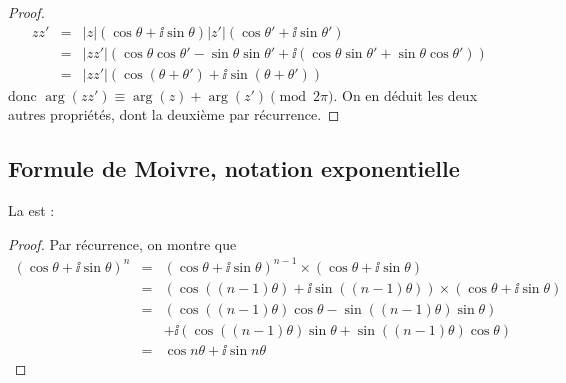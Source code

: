 \documentclass[class=report,crop=false]{standalone}
\begin{document}
\begin{proof}
  \begin{eqnarray*}
    zz' & = & \left| z \right|  \left( \cos \theta + \ii  \sin \theta \right)
    \left| z' \right|  \left( \cos \theta' + \ii  \sin \theta' \right)\\
    & = & \left| zz' \right|  \left( \cos \theta \cos \theta' - \sin \theta
    \sin \theta' + \ii  \left( \cos \theta \sin \theta' + \sin \theta \cos
    \theta' \right) \right)\\
    & = & \left| zz' \right|  \left( \cos \left( \theta + \theta' \right) + \ii
    \sin \left( \theta + \theta' \right) \right)
  \end{eqnarray*}
  donc $\arg \left( zz' \right) \equiv \arg (z) + \arg \left( z'
  \right) \pmod {2\pi}$. On en déduit les deux autres propriétés,
  dont la deuxième par récurrence.
\end{proof}

\subsection{Formule de Moivre, notation exponentielle}


La  est :

\begin{proof}
  Par récurrence, on montre que
  \begin{eqnarray*}
    \left( \cos \theta + \ii  \sin \theta \right)^n & = & ( \cos \theta + \ii \sin \theta)^{n-1}
 \times \left( \cos \theta + \ii  \sin \theta \right)
    \\
  & = & \left( \cos \left(
    \left( n - 1 \right) \theta \right) + \ii  \sin \left( \left( n - 1 \right)
    \theta \right) \right) \times \left( \cos \theta + \ii  \sin \theta \right)
    \\
    & = & \left( \cos \left( \left( n - 1 \right) \theta \right) \cos \theta
    - \sin \left( \left( n - 1 \right) \theta \right) \sin \theta \right)
    \\
    && + \ii
    \left( \cos \left( \left( n - 1 \right) \theta \right) \sin \theta + \sin
    \left( \left( n - 1 \right) \theta \right) \cos \theta \right)
    \\
    & = & \cos n \theta + \ii  \sin n \theta
  \end{eqnarray*}
\end{proof}
\end{document}
